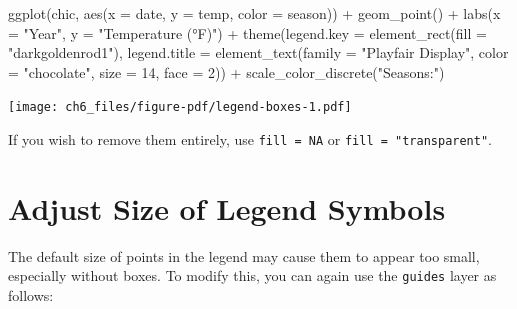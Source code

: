 \documentclass[
  letterpaper,
]{scrbook}
\newenvironment{Shaded}{\begin{snugshade}}{\end{snugshade}}
\newcommand{\AttributeTok}[1]{\textcolor[rgb]{0.40,0.45,0.13}{#1}}
\newcommand{\DecValTok}[1]{\textcolor[rgb]{0.68,0.00,0.00}{#1}}
\newcommand{\FunctionTok}[1]{\textcolor[rgb]{0.28,0.35,0.67}{#1}}
\newcommand{\NormalTok}[1]{\textcolor[rgb]{0.00,0.23,0.31}{#1}}
\newcommand{\SpecialCharTok}[1]{\textcolor[rgb]{0.37,0.37,0.37}{#1}}
\newcommand{\StringTok}[1]{\textcolor[rgb]{0.13,0.47,0.30}{#1}}
\begin{document}
\begin{Shaded}
\begin{Highlighting}[]
\FunctionTok{ggplot}\NormalTok{(chic, }\FunctionTok{aes}\NormalTok{(}\AttributeTok{x =}\NormalTok{ date, }\AttributeTok{y =}\NormalTok{ temp, }\AttributeTok{color =}\NormalTok{ season)) }\SpecialCharTok{+}
  \FunctionTok{geom\_point}\NormalTok{() }\SpecialCharTok{+}
  \FunctionTok{labs}\NormalTok{(}\AttributeTok{x =} \StringTok{"Year"}\NormalTok{, }\AttributeTok{y =} \StringTok{"Temperature (°F)"}\NormalTok{) }\SpecialCharTok{+}
  \FunctionTok{theme}\NormalTok{(}\AttributeTok{legend.key =} \FunctionTok{element\_rect}\NormalTok{(}\AttributeTok{fill =} \StringTok{"darkgoldenrod1"}\NormalTok{),}
        \AttributeTok{legend.title =} \FunctionTok{element\_text}\NormalTok{(}\AttributeTok{family =} \StringTok{"Playfair Display"}\NormalTok{,}
                                    \AttributeTok{color =} \StringTok{"chocolate"}\NormalTok{,}
                                    \AttributeTok{size =} \DecValTok{14}\NormalTok{, }\AttributeTok{face =} \DecValTok{2}\NormalTok{)) }\SpecialCharTok{+}
  \FunctionTok{scale\_color\_discrete}\NormalTok{(}\StringTok{"Seasons:"}\NormalTok{)}
\end{Highlighting}
\end{Shaded}

\texttt{[image: ch6\_files/figure-pdf/legend-boxes-1.pdf]}

If you wish to remove them entirely, use \texttt{fill\ =\ NA} or
\texttt{fill\ =\ "transparent"}.

\section{Adjust Size of Legend
Symbols}\label{adjust-size-of-legend-symbols}

The default size of points in the legend may cause them to appear too
small, especially without boxes. To modify this, you can again use the
\texttt{guides} layer as follows:
\end{document}
